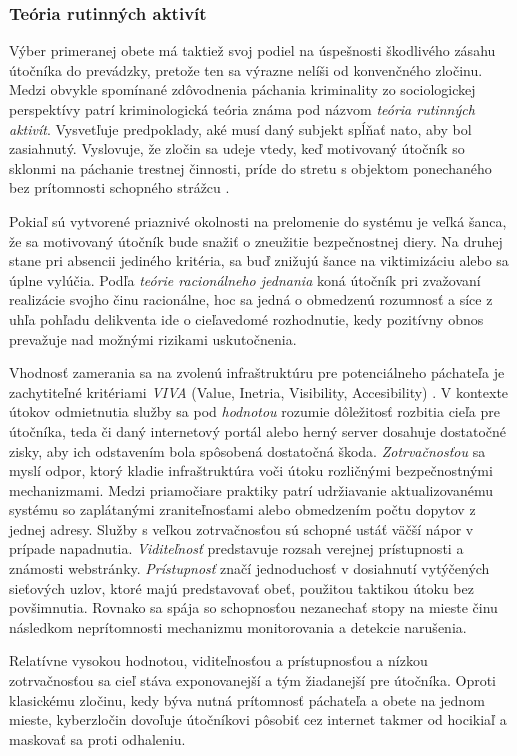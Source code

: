 \documentclass[12pt, a4paper]{article}
\begin{document}
\subsubsection{Teória rutinných aktivít}
Výber primeranej obete má taktiež svoj podiel na úspešnosti škodlivého zásahu útočníka do prevádzky,
pretože ten sa výrazne nelíši od konvenčného zločinu. Medzi obvykle spomínané zdôvodnenia páchania 
kriminality zo sociologickej perspektívy patrí kriminologická teória známa pod názvom 
\emph{teória rutinných aktivít}. Vysvetľuje predpoklady, aké musí daný subjekt spĺňať nato, aby bol 
zasiahnutý. Vyslovuje, že zločin sa udeje vtedy, keď motivovaný útočník so sklonmi na páchanie trestnej 
činnosti, príde do stretu s objektom ponechaného bez prítomnosti schopného strážcu \cite{cohen-felson}.

Pokiaľ sú vytvorené priaznivé okolnosti na prelomenie do systému je veľká šanca, že sa motivovaný útočník 
bude snažiť o zneužitie bezpečnostnej diery. Na druhej stane pri absencii jediného kritéria, sa buď 
znižujú šance na viktimizáciu alebo sa úplne vylúčia. Podľa \emph{teórie racionálneho jednania} koná 
útočník pri zvažovaní realizácie svojho činu racionálne, hoc sa jedná o obmedzenú rozumnosť a síce z uhľa 
pohľadu delikventa ide o cieľavedomé rozhodnutie, kedy pozitívny obnos prevažuje nad možnými rizikami 
uskutočnenia.

Vhodnosť zamerania sa na zvolenú infraštruktúru pre potenciálneho páchateľa je zachytiteľné kritériami 
\emph{VIVA} (Value, Inetria, Visibility, Accesibility) \cite{why-attack}. V kontexte útokov odmietnutia 
služby sa pod \emph{hodnotou} rozumie dôležitosť rozbitia cieľa pre útočníka, teda či daný internetový 
portál alebo herný server dosahuje dostatočné zisky, aby ich odstavením bola spôsobená dostatočná škoda. 
\emph{Zotrvačnosťou} sa myslí odpor, ktorý kladie infraštruktúra voči útoku rozličnými bezpečnostnými 
mechanizmami. Medzi priamočiare praktiky patrí udržiavanie aktualizovanému systému so zaplátanými 
zraniteľnosťami alebo obmedzením počtu dopytov z jednej adresy. Služby s veľkou zotrvačnosťou sú schopné 
ustáť väčší nápor v prípade napadnutia. \emph{Viditeľnosť} predstavuje rozsah verejnej prístupnosti a 
známosti webstránky. \emph{Prístupnosť} značí jednoduchosť v dosiahnutí vytýčených sieťových 
uzlov, ktoré majú predstavovať obeť, použitou taktikou útoku bez povšimnutia. Rovnako sa spája so 
schopnosťou nezanechať stopy na mieste činu následkom neprítomnosti mechanizmu monitorovania a detekcie 
narušenia. 

Relatívne vysokou hodnotou, viditeľnosťou a prístupnosťou a nízkou zotrvačnosťou sa cieľ stáva 
exponovanejší a tým žiadanejší pre útočníka. Oproti klasickému zločinu, kedy býva nutná 
prítomnosť páchateľa a obete na jednom mieste, kyberzločin dovoľuje útočníkovi pôsobiť cez internet takmer 
od hocikiaľ a maskovať sa proti odhaleniu.
\end{document}
